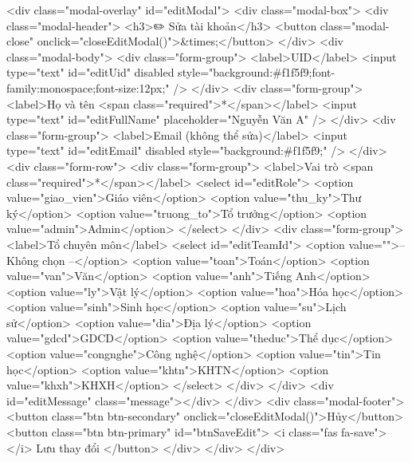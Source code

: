     <div class="modal-overlay" id="editModal">
        <div class="modal-box">
            <div class="modal-header">
                <h3>✏️ Sửa tài khoản</h3>
                <button class="modal-close" onclick="closeEditModal()">&times;</button>
            </div>
            <div class="modal-body">
                <div class="form-group">
                    <label>UID</label>
                    <input type="text" id="editUid" disabled style="background:#f1f5f9;font-family:monospace;font-size:12px;" />
                </div>
                <div class="form-group">
                    <label>Họ và tên <span class="required">*</span></label>
                    <input type="text" id="editFullName" placeholder="Nguyễn Văn A" />
                </div>
                <div class="form-group">
                    <label>Email (không thể sửa)</label>
                    <input type="text" id="editEmail" disabled style="background:#f1f5f9;" />
                </div>
                <div class="form-row">
                    <div class="form-group">
                        <label>Vai trò <span class="required">*</span></label>
                        <select id="editRole">
                            <option value="giao_vien">Giáo viên</option>
                            <option value="thu_ky">Thư ký</option>
                            <option value="truong_to">Tổ trưởng</option>
                            <option value="admin">Admin</option>
                        </select>
                    </div>
                    <div class="form-group">
                        <label>Tổ chuyên môn</label>
                        <select id="editTeamId">
                            <option value="">-- Không chọn --</option>
                            <option value="toan">Toán</option>
                            <option value="van">Văn</option>
                            <option value="anh">Tiếng Anh</option>
                            <option value="ly">Vật lý</option>
                            <option value="hoa">Hóa học</option>
                            <option value="sinh">Sinh học</option>
                            <option value="su">Lịch sử</option>
                            <option value="dia">Địa lý</option>
                            <option value="gdcd">GDCD</option>
                            <option value="theduc">Thể dục</option>
                            <option value="congnghe">Công nghệ</option>
                            <option value="tin">Tin học</option>
                            <option value="khtn">KHTN</option>
                            <option value="khxh">KHXH</option>
                        </select>
                    </div>
                </div>
                <div id="editMessage" class="message"></div>
            </div>
            <div class="modal-footer">
                <button class="btn btn-secondary" onclick="closeEditModal()">Hủy</button>
                <button class="btn btn-primary" id="btnSaveEdit">
                    <i class="fas fa-save"></i> Lưu thay đổi
                </button>
            </div>
        </div>
    </div>

